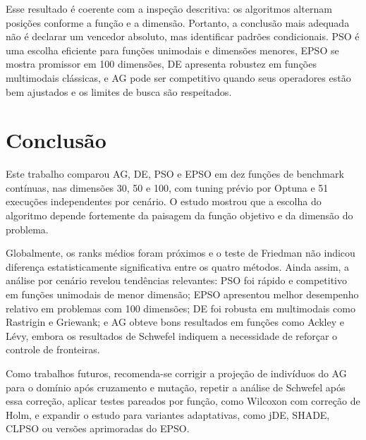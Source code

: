 \documentclass[runningheads]{llncs}
\begin{document}
Esse resultado é coerente com a inspeção descritiva: os algoritmos alternam posições conforme a função e a dimensão. Portanto, a conclusão mais adequada não é declarar um vencedor absoluto, mas identificar padrões condicionais. PSO é uma escolha eficiente para funções unimodais e dimensões menores, EPSO se mostra promissor em 100 dimensões, DE apresenta robustez em funções multimodais clássicas, e AG pode ser competitivo quando seus operadores estão bem ajustados e os limites de busca são respeitados.

\section{Conclusão}

Este trabalho comparou AG, DE, PSO e EPSO em dez funções de benchmark contínuas, nas dimensões 30, 50 e 100, com tuning prévio por Optuna e 51 execuções independentes por cenário. O estudo mostrou que a escolha do algoritmo depende fortemente da paisagem da função objetivo e da dimensão do problema.

Globalmente, os ranks médios foram próximos e o teste de Friedman não indicou diferença estatisticamente significativa entre os quatro métodos. Ainda assim, a análise por cenário revelou tendências relevantes: PSO foi rápido e competitivo em funções unimodais de menor dimensão; EPSO apresentou melhor desempenho relativo em problemas com 100 dimensões; DE foi robusta em multimodais como Rastrigin e Griewank; e AG obteve bons resultados em funções como Ackley e Lévy, embora os resultados de Schwefel indiquem a necessidade de reforçar o controle de fronteiras.

Como trabalhos futuros, recomenda-se corrigir a projeção de indivíduos do AG para o domínio após cruzamento e mutação, repetir a análise de Schwefel após essa correção, aplicar testes pareados por função, como Wilcoxon com correção de Holm, e expandir o estudo para variantes adaptativas, como jDE, SHADE, CLPSO ou versões aprimoradas do EPSO.



\end{document}
